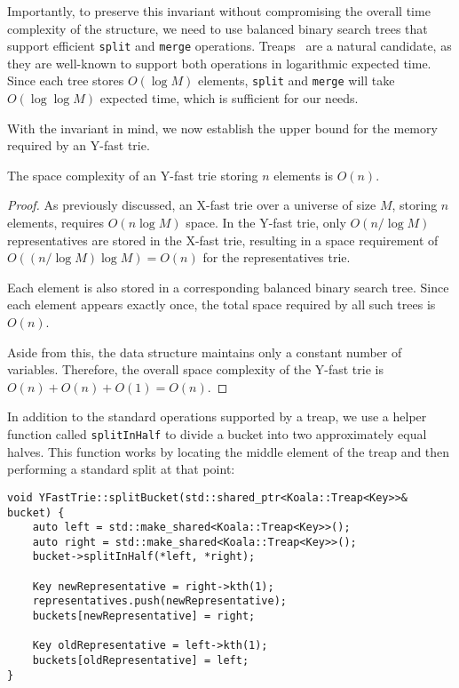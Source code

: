 Importantly, to preserve this invariant without compromising the overall time complexity of the structure, we need to use balanced binary search trees that support efficient \texttt{split} and \texttt{merge} operations. Treaps~\cite{seidel1996treaps} are a natural candidate, as they are well-known to support both operations in logarithmic expected time. Since each tree stores \( O(\log M) \) elements, \texttt{split} and \texttt{merge} will take \( O(\log \log M) \) expected time, which is sufficient for our needs.

With the invariant in mind, we now establish the upper bound for the memory required by an Y-fast trie.

\begin{lemma}
The space complexity of an Y-fast trie storing \( n\) elements is \( O(n) \).
\end{lemma}

\begin{proof}
As previously discussed, an X-fast trie over a universe of size \( M \), storing \( n \) elements, requires \( O(n \log M) \) space. In the Y-fast trie, only \( O(n / \log M) \) representatives are stored in the X-fast trie, resulting in a space requirement of \( O((n / \log M) \log M) = O(n) \) for the representatives trie.

Each element is also stored in a corresponding balanced binary search tree. Since each element appears exactly once, the total space required by all such trees is \( O(n) \).

Aside from this, the data structure maintains only a constant number of variables. Therefore, the overall space complexity of the Y-fast trie is \( O(n) + O(n) + O(1) = O(n) \).
\end{proof}

In addition to the standard operations supported by a treap, we use a helper function called \texttt{splitInHalf} to divide a bucket into two approximately equal halves. This function works by locating the middle element of the treap and then performing a standard split at that point:

\begin{verbatim}
void YFastTrie::splitBucket(std::shared_ptr<Koala::Treap<Key>>& bucket) {
    auto left = std::make_shared<Koala::Treap<Key>>();
    auto right = std::make_shared<Koala::Treap<Key>>();
    bucket->splitInHalf(*left, *right);

    Key newRepresentative = right->kth(1);
    representatives.push(newRepresentative);
    buckets[newRepresentative] = right;

    Key oldRepresentative = left->kth(1);
    buckets[oldRepresentative] = left;
}
\end{verbatim}


